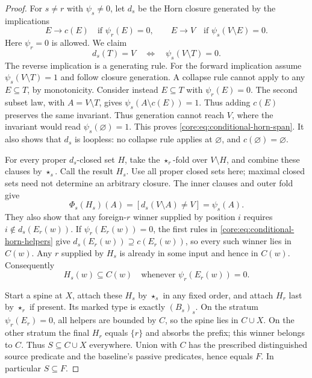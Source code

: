 \begin{proof}
For $s\ne r$ with $\psi_s\ne0$, let $d_s$ be the Horn closure
generated by the implications
\begin{equation}\label{core:eq:conditional-horn-helpers}
 E\longrightarrow c(E)\quad\text{if }\psi_r(E)=0,
 \qquad
 E\longrightarrow V\quad\text{if }\psi_s(V\setminus E)=0.
\end{equation}
Here $\psi_r=0$ is allowed. We claim
\begin{equation}\label{core:eq:conditional-horn-span}
 d_s(T)=V\quad\Longleftrightarrow\quad\psi_s(V\setminus T)=0.
\end{equation}
The reverse implication is a generating rule. For the forward
implication assume $\psi_s(V\setminus T)=1$ and follow closure
generation. A collapse rule cannot apply to any $E\subseteq T$,
by monotonicity. Consider instead $E\subseteq T$ with $\psi_r(E)=0$.
The second subset law, with $A=V\setminus T$, gives
$\psi_s(A\setminus c(E))=1$.
Thus adding $c(E)$ preserves the same invariant.
Thus generation cannot reach $V$, where the invariant would read
$\psi_s(\varnothing)=1$. This proves
\eqref{core:eq:conditional-horn-span}. It also shows that $d_s$ is
loopless: no collapse rule applies at $\varnothing$, and
$c(\varnothing)=\varnothing$.

For every proper $d_s$-closed set $H$, take the $\star_r$-fold
over $V\setminus H$, and combine these clauses by $\star_s$.
Call the result $H_s$. Use all proper closed sets here; maximal
closed sets need not determine an arbitrary closure.
The inner clauses and outer fold give
\[
 \Phi_s(H_s)(A)=[d_s(V\setminus A)\ne V]=\psi_s(A).
\]
They also show that any foreign-$r$ winner supplied by position $i$
requires $i\notin d_s(E_r(w))$. If $\psi_r(E_r(w))=0$, the first
rules in \eqref{core:eq:conditional-horn-helpers} give
$d_s(E_r(w))\supseteq c(E_r(w))$, so every such winner lies in
$C(w)$. Any $r$ supplied by $H_s$ is already in some input and
hence in $C(w)$. Consequently
\[
 H_s(w)\subseteq C(w)\quad\text{whenever }\psi_r(E_r(w))=0.
\]

Start a spine at $X$, attach these $H_s$ by $\star_s$ in any
fixed order, and attach $H_r$ last by $\star_r$ if present.
Its marked type is exactly $(B_s)_s$.
On the stratum $\psi_r(E_r)=0$, all helpers are bounded by $C$,
so the spine lies in $C\cup X$. On the other stratum the final
$H_r$ equals $\{r\}$ and absorbs the prefix; this winner belongs
to $C$. Thus $S\subseteq C\cup X$ everywhere. Union with $C$
has the prescribed distinguished source predicate and the baseline's
passive predicates, hence equals $F$. In particular $S\subseteq F$.
\end{proof}

